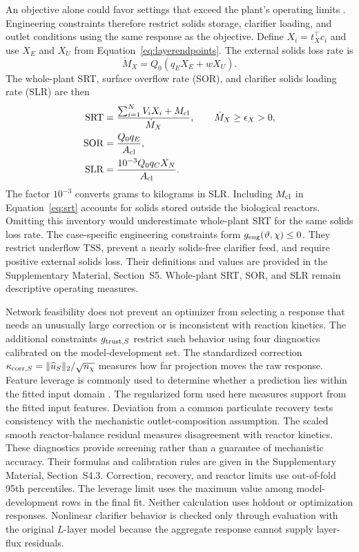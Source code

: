 \documentclass[a4paper,fleqn]{cas-sc}
\begin{document}
An objective alone could favor settings that exceed the plant's operating limits \citep{Araujo2013}. Engineering constraints therefore restrict solids storage, clarifier loading, and outlet conditions using the same response as the objective. Define $X_i=t_X^\top c_i$ and use $X_E$ and $X_U$ from Equation~\eqref{eq:layerendpoints}. The external solids loss rate is
\begin{equation}
\dot M_X=Q_0(q_EX_E+wX_U).
\end{equation}
The whole-plant SRT, surface overflow rate (SOR), and clarifier solids loading rate (SLR) are then
\begin{align}
\mathrm{SRT}&=\frac{\sum_{i=1}^{N}V_iX_i+M_{\rm cl}}{\dot M_X},
\qquad \dot M_X\ge\epsilon_X>0,\label{eq:srt}\\
\mathrm{SOR}&=\frac{Q_0q_E}{A_{\rm cl}},\label{eq:sor}\\
\mathrm{SLR}&=\frac{10^{-3}Q_0q_CX_N}{A_{\rm cl}}.
\label{eq:slr}
\end{align}
The factor $10^{-3}$ converts grams to kilograms in SLR. Including $M_{\rm cl}$ in Equation~\eqref{eq:srt} accounts for solids stored outside the biological reactors. Omitting this inventory would underestimate whole-plant SRT for the same solids loss rate. The case-specific engineering constraints form $g_{\rm eng}(\vartheta,\chi)\le0$. They restrict underflow TSS, prevent a nearly solids-free clarifier feed, and require positive external solids loss. Their definitions and values are provided in the Supplementary Material, Section~S5. Whole-plant SRT, SOR, and SLR remain descriptive operating measures.

Network feasibility does not prevent an optimizer from selecting a response that needs an unusually large correction or is inconsistent with reaction kinetics. The additional constraints $g_{{\rm trust},S}$ restrict such behavior using four diagnostics calibrated on the model-development set. The standardized correction $\kappa_{{\rm corr},S}=\|\widehat u_S\|_2/\sqrt{n_\chi}$ measures how far projection moves the raw response. Feature leverage is commonly used to determine whether a prediction lies within the fitted input domain \citep{Sahigara2012}. The regularized form used here measures support from the fitted input features. Deviation from a common particulate recovery tests consistency with the mechanistic outlet-composition assumption. The scaled smooth reactor-balance residual measures disagreement with reactor kinetics. These diagnostics provide screening rather than a guarantee of mechanistic accuracy. Their formulas and calibration rules are given in the Supplementary Material, Section~S4.3. Correction, recovery, and reactor limits use out-of-fold 95th percentiles. The leverage limit uses the maximum value among model-development rows in the final fit. Neither calculation uses holdout or optimization responses. Nonlinear clarifier behavior is checked only through evaluation with the original $L$-layer model because the aggregate response cannot supply layer-flux residuals.
\end{document}
